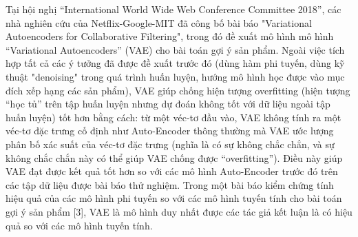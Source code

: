 Tại hội nghị ``International World Wide Web Conference Committee 2018'', các nhà nghiên cứu của Netflix-Google-MIT đã công bố bài báo "Variational Autoencoders for Collaborative Filtering", trong đó đề xuất mô hình mô hình ``Variational Autoencoders'' (VAE) cho bài toán gợi ý sản phẩm.
Ngoài việc tích hợp tất cả các ý tưởng đã được đề xuất trước đó (dùng hàm phi tuyến, dùng kỹ thuật "denoising" trong quá trình huấn luyện, hướng mô hình học được vào mục đích xếp hạng các sản phẩm), VAE giúp chống hiện tượng overfitting (hiện tượng ``học tủ'' trên tập huấn luyện nhưng dự đoán không tốt với dữ liệu ngoài tập huấn luyện) tốt hơn bằng cách: từ một véc-tơ đầu vào, VAE không tính ra một véc-tơ đặc trưng cố định như Auto-Encoder thông thường mà VAE ước lượng phân bố xác suất của véc-tơ đặc trưng (nghĩa là có sự không chắc chắn, và sự không chắc chắn này có thể giúp VAE chống được ``overfitting''). 
Điều này giúp VAE đạt được kết quả tốt hơn so với các mô hình Auto-Encoder trước đó trên các tập dữ liệu được bài báo thử nghiệm. 
Trong một bài báo kiểm chứng tính hiệu quả của các mô hình phi tuyến so với các mô hình tuyến tính cho bài toán gợi ý sản phẩm [3], VAE là mô hình duy nhất được các tác giả kết luận là có hiệu quả so với các mô hình tuyến tính.



